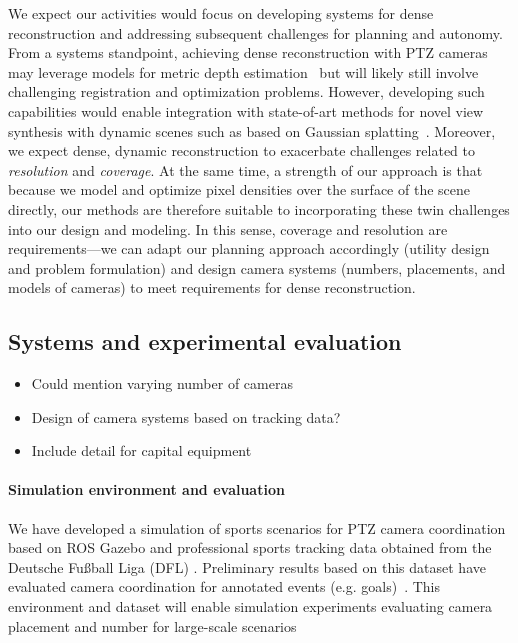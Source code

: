\documentclass[11pt]{article}
\begin{document}
\begin{development}
We expect our activities would focus on developing systems for dense
reconstruction and addressing subsequent challenges for planning and autonomy.
From a systems standpoint, achieving dense reconstruction with PTZ cameras
may leverage models for metric depth estimation~\citep{ke2024cvpr}
but will likely still involve challenging registration and optimization
problems.
However, developing such capabilities would enable integration with
state-of-art methods for novel view synthesis with dynamic scenes such as based
on Gaussian splatting~\citep{zheng2025cvpr}.
Moreover, we expect dense, dynamic reconstruction to exacerbate challenges
related to \emph{resolution} and \emph{coverage}.
At the same time, a strength of our approach is that because we model and
optimize pixel densities over the surface of the scene directly, our methods are
therefore suitable to incorporating these twin challenges into our design and
modeling.
In this sense, coverage and resolution are requirements---we can adapt our
planning approach accordingly (utility design and problem formulation) and
design camera systems (numbers, placements, and models of cameras) to meet
requirements for dense reconstruction.
\end{development}

\subsection{Systems and experimental evaluation}

\begin{development}
\begin{itemize}
  \item Could mention varying number of cameras
  \item Design of camera systems based on tracking data?
  \item Include detail for capital equipment
\end{itemize}
\end{development}

\paragraph{Simulation environment and evaluation}


We have developed a simulation of sports scenarios for PTZ camera coordination
based on ROS Gazebo and professional sports tracking data obtained
from the Deutsche Fu\ss ball Liga (DFL) \cite{bassek2025integrated}.
Preliminary results based on this dataset have evaluated camera
coordination for annotated events (e.g. goals)~\citep{bouy2026}.
This environment and dataset will enable simulation experiments evaluating
camera placement and number for large-scale scenarios
\end{document}

